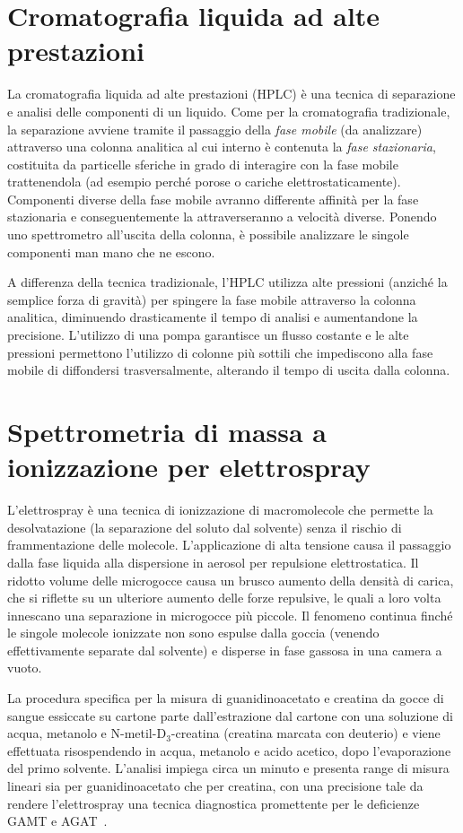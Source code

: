 	\section{Cromatografia liquida ad alte prestazioni}\label{sez:hplc}
	La cromatografia liquida ad alte prestazioni (HPLC) \`e una tecnica di separazione e analisi delle componenti di un liquido.
	Come per la cromatografia tradizionale, la separazione avviene tramite il passaggio della \emph{fase mobile} (da analizzare) attraverso una colonna analitica al cui interno \`e contenuta la \emph{fase stazionaria}, costituita da particelle sferiche in grado di interagire con la fase mobile trattenendola (ad esempio perch\'e porose o cariche elettrostaticamente).
	Componenti diverse della fase mobile avranno differente affinit\`a per la fase stazionaria e conseguentemente la attraverseranno a velocit\`a diverse.
	Ponendo uno spettrometro all'uscita della colonna, \`e possibile analizzare le singole componenti man mano che ne escono.
	
	A differenza della tecnica tradizionale, l'HPLC utilizza alte pressioni (anzich\'e la semplice forza di gravit\`a) per spingere la fase mobile attraverso la colonna analitica, diminuendo drasticamente il tempo di analisi e aumentandone la precisione.
	L'utilizzo di una pompa garantisce un flusso costante e le alte pressioni permettono l'utilizzo di colonne pi\`u sottili che impediscono alla fase mobile di diffondersi trasversalmente, alterando il tempo di uscita dalla colonna.
		
	\section{Spettrometria di massa a ionizzazione per elettrospray}\label{sez:spray}
	L'elettrospray \`e una tecnica di ionizzazione di macromolecole che permette la desolvatazione (la separazione del soluto dal solvente) senza il rischio di frammentazione delle molecole.
	L'applicazione di alta tensione causa il passaggio dalla fase liquida alla dispersione in aerosol per repulsione elettrostatica.
	Il ridotto volume delle microgocce causa un brusco aumento della densit\`a di carica, che si riflette su un ulteriore aumento delle forze repulsive, le quali a loro volta innescano una separazione in microgocce pi\`u piccole.
	Il fenomeno continua finch\'e le singole molecole ionizzate non sono espulse dalla goccia (venendo effettivamente separate dal solvente) e disperse in fase gassosa in una camera a vuoto.

	La procedura specifica per la misura di guanidinoacetato e creatina da gocce di sangue essiccate su cartone parte dall'estrazione dal cartone con una soluzione di acqua, metanolo e N-metil-D$_3$-creatina (creatina marcata con deuterio) e viene effettuata risospendendo in acqua, metanolo e acido acetico, dopo l'evaporazione del primo solvente.
	L'analisi impiega circa un minuto e presenta range di misura lineari sia per guanidinoacetato che per creatina, con una precisione tale da rendere l'elettrospray una tecnica diagnostica promettente per le deficienze GAMT e AGAT~\cite{carducci2006quantitative}.
	
